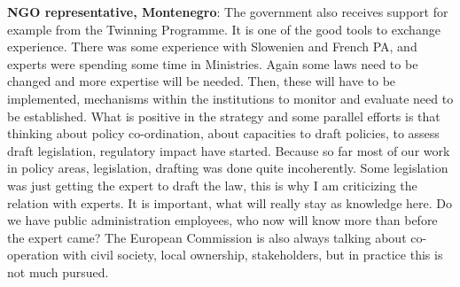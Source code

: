 \textbf{NGO representative, Montenegro}: The government also receives support for example from the Twinning Programme. It is one of the good tools to exchange experience. There was some experience with Slowenien and French PA, and experts were spending some time in Ministries. Again some laws need to be changed and more expertise will be needed. Then, these will have to be implemented, mechanisms within the institutions to monitor and evaluate need to be established. What is positive in the strategy and some parallel efforts is that thinking about policy co-ordination, about capacities to draft policies, to assess draft legislation, regulatory impact have started. Because so far most of our work in policy areas, legislation, drafting was done quite incoherently. Some legislation was just getting the expert to draft the law, this is why I am criticizing the relation with experts. It is important, what will really stay as knowledge here. Do we have public administration employees, who now will know more than before the expert came?  The European Commission is also always talking about co-operation with civil society, local ownership, stakeholders, but in practice this is not much pursued.%
